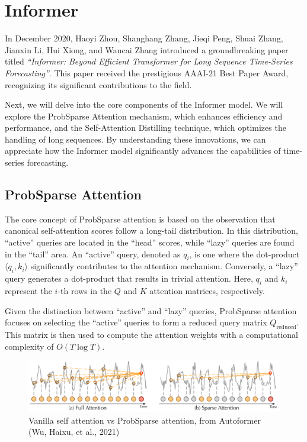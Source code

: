 \section{Informer}
In December 2020, Haoyi Zhou, Shanghang Zhang, Jieqi Peng, Shuai Zhang, Jianxin Li, Hui Xiong, and Wancai Zhang introduced a groundbreaking paper titled \textit{``Informer: Beyond Efficient Transformer for Long Sequence Time-Series Forecasting''}. This paper received the prestigious AAAI-21 Best Paper Award, recognizing its significant contributions to the field.

Next, we will delve into the core components of the Informer model. We will explore the ProbSparse Attention mechanism, which enhances efficiency and performance, and the Self-Attention Distilling technique, which optimizes the handling of long sequences. By understanding these innovations, we can appreciate how the Informer model significantly advances the capabilities of time-series forecasting.

\subsection{ProbSparse Attention}
The core concept of ProbSparse attention is based on the observation that canonical self-attention scores follow a long-tail distribution. In this distribution, ``active'' queries are located in the ``head'' scores, while ``lazy'' queries are found in the ``tail'' area. An ``active'' query, denoted as \( q_i \), is one where the dot-product \( \langle q_i, k_i \rangle \) significantly contributes to the attention mechanism. Conversely, a ``lazy'' query generates a dot-product that results in trivial attention. Here, \( q_i \) and \( k_i \) represent the \( i \)-th rows in the \( Q \) and \( K \) attention matrices, respectively.

Given the distinction between ``active'' and ``lazy'' queries, ProbSparse attention focuses on selecting the ``active'' queries to form a reduced query matrix \( Q_{\text{reduced}} \). This matrix is then used to compute the attention weights with a computational complexity of \( O(T \log T) \).

\begin{figure}[htbp]
    \centering
    \includegraphics[width=15cm]{3_ChapterTranformerVariants/figuras/ProbSparceAttention.pdf}
    \caption{Vanilla self attention vs ProbSparse attention, from Autoformer (Wu, Haixu, et al., 2021)\cite{wu2022autoformerdecompositiontransformersautocorrelation}}
    \end{figure}

